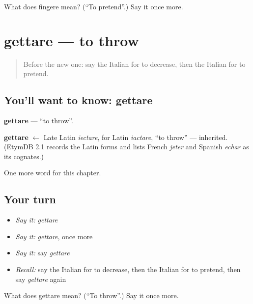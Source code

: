 \begin{tcolorbox}[breakable,colback=teal!4,colframe=teal!35!black,title={Before you move on}]
What does fingere mean? (\textquotedblleft{}To pretend\textquotedblright{}.) Say it once more.
\end{tcolorbox}
\section[gettare]{gettare — to throw}

\label{lesson:IT-C209-gettare}



\begin{quote}
Before the new one: say the Italian for to decrease, then the Italian for to pretend.
\end{quote}

\subsection*{You'll want to know: gettare}
\textbf{gettare} — \textquotedblleft{}to throw\textquotedblright{}.

\begin{cousinweb}
\textbf{gettare} $\leftarrow$ Late Latin \emph{iectare}, for Latin \emph{iactare}, \textquotedblleft{}to throw\textquotedblright{} — inherited. (EtymDB 2.1 records the Latin forms and lists French \emph{jeter} and Spanish \emph{echar} as its cognates.)
\end{cousinweb}

\begin{grammarlens}[title={What you've built}]
One more word for this chapter.
\end{grammarlens}

\subsection*{Your turn}
\begin{itemize}
\raggedright
  \item \emph{Say it:} \emph{gettare}
  \item \emph{Say it:} \emph{gettare}, once more
  \item \emph{Say it:} say \emph{gettare}
  \item \emph{Recall:} say the Italian for to decrease, then the Italian for to pretend, then say \emph{gettare} again
\end{itemize}

\begin{tcolorbox}[breakable,colback=teal!4,colframe=teal!35!black,title={Before you move on}]
What does gettare mean? (\textquotedblleft{}To throw\textquotedblright{}.) Say it once more.
\end{tcolorbox}
